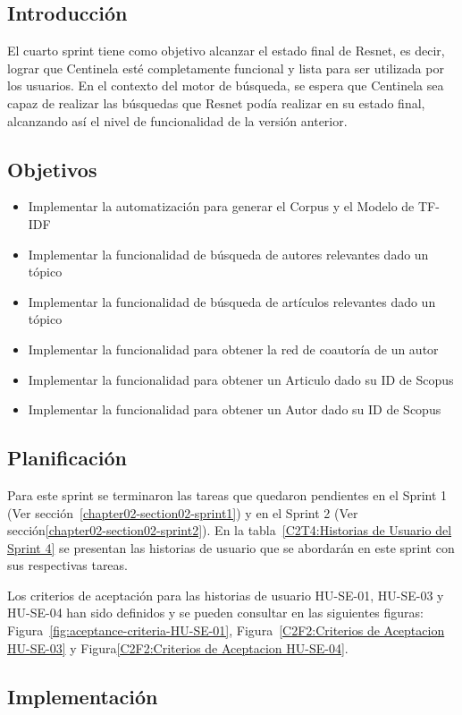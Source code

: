 \subsection{Introducción}
El cuarto sprint tiene como objetivo alcanzar el estado final de Resnet,
es decir, lograr que Centinela esté completamente funcional y lista para ser
utilizada por los usuarios. En el contexto del motor de búsqueda,
se espera que  Centinela sea capaz de realizar las búsquedas
que Resnet podía realizar en su estado final, alcanzando así el nivel de funcionalidad de la versión anterior.
\subsection{Objetivos}
\begin{itemize}
    \item Implementar la automatización para generar el Corpus y el Modelo de TF-IDF
    \item Implementar la funcionalidad de búsqueda de autores relevantes dado un tópico
    \item Implementar la funcionalidad de búsqueda de artículos relevantes dado un tópico
    \item Implementar la funcionalidad para obtener la red de coautoría de un autor
    \item Implementar la funcionalidad para obtener un Articulo dado su ID de Scopus
    \item Implementar la funcionalidad para obtener un Autor dado su ID de Scopus
\end{itemize}
\subsection{Planificación}
Para este sprint se terminaron las tareas que quedaron pendientes en el Sprint 1 (Ver sección~\ref{chapter02-section02-sprint1})  y en el Sprint 2 (Ver sección\ref{chapter02-section02-sprint2}).
En la tabla~\ref{C2T4:Historias de Usuario del Sprint 4} se presentan las historias de usuario que se abordarán en este sprint con sus respectivas tareas.


Los criterios de aceptación para las historias de usuario HU-SE-01, HU-SE-03 y HU-SE-04 han sido definidos y se pueden consultar en las siguientes figuras: Figura~\ref{fig:aceptance-criteria-HU-SE-01}, Figura~\ref{C2F2:Criterios de Aceptacion HU-SE-03} y Figura\ref{C2F2:Criterios de Aceptacion HU-SE-04}.
\subsection{Implementación}

